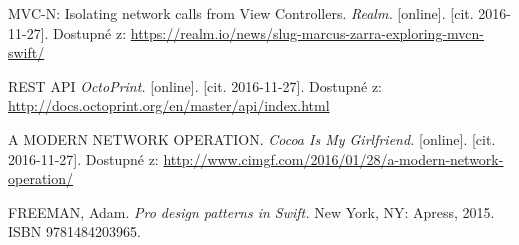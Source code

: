 \documentclass[czech]{article}
\begin{document}
\begin{thebibliography}{}

  MVC-N: Isolating network calls from View Controllers. \emph{Realm.} [online]. [cit. 2016-11-27]. Dostupné z: \url{https://realm.io/news/slug-marcus-zarra-exploring-mvcn-swift/}

  REST API \emph{OctoPrint.} [online]. [cit. 2016-11-27]. Dostupné z: \url{http://docs.octoprint.org/en/master/api/index.html}

  A MODERN NETWORK OPERATION. \emph{Cocoa Is My Girlfriend.} [online]. [cit. 2016-11-27]. Dostupné z: \url{http://www.cimgf.com/2016/01/28/a-modern-network-operation/}

  FREEMAN, Adam. \textit{Pro design patterns in Swift.} New York, NY: Apress, 2015. ISBN 9781484203965.

\end{thebibliography}

\newpage
\end{document}

